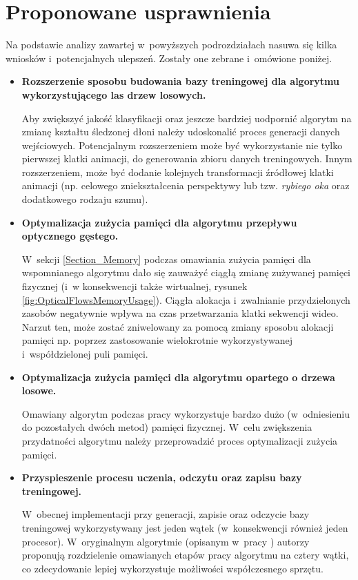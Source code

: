   \section{Proponowane usprawnienia}\label{Section_Usprawnienia}

    Na podstawie analizy zawartej w~powyższych podrozdziałach nasuwa się kilka wniosków i~potencjalnych ulepszeń. Zostały one zebrane i~omówione poniżej.

    \begin{itemize}
      \item \textbf{Rozszerzenie sposobu budowania bazy treningowej dla algorytmu wykorzystującego las drzew losowych.}

      Aby zwiększyć jakość klasyfikacji oraz jeszcze bardziej uodpornić algorytm na zmianę kształtu śledzonej dłoni należy udoskonalić proces generacji danych wejściowych. Potencjalnym rozszerzeniem może być wykorzystanie nie tylko pierwszej klatki animacji, do generowania zbioru danych treningowych. Innym rozszerzeniem, może być dodanie kolejnych transformacji źródłowej klatki animacji (np. celowego zniekształcenia perspektywy lub tzw. \textit{rybiego oka} oraz dodatkowego rodzaju szumu).

      \item \textbf{Optymalizacja zużycia pamięci dla algorytmu przepływu optycznego gęstego.}

      W~sekcji \ref{Section_Memory} podczas omawiania zużycia pamięci dla wspomnianego algorytmu dało się zauważyć ciągłą zmianę zużywanej pamięci fizycznej (i~w konsekwencji także wirtualnej, rysunek \ref{fig:OpticalFlowsMemoryUsage}). Ciągła alokacja i~zwalnianie przydzielonych zasobów negatywnie wpływa na czas przetwarzania klatki sekwencji wideo. Narzut ten, może zostać zniwelowany za pomocą zmiany sposobu alokacji pamięci np. poprzez zastosowanie wielokrotnie wykorzystywanej i~współdzielonej puli pamięci.

      \item \textbf{Optymalizacja zużycia pamięci dla algorytmu opartego o drzewa losowe.}

      Omawiany algorytm podczas pracy wykorzystuje bardzo dużo (w~odniesieniu do pozostałych dwóch metod) pamięci fizycznej. W~celu zwiększenia przydatności algorytmu należy przeprowadzić proces optymalizacji zużycia pamięci.

      \item \textbf{Przyspieszenie procesu uczenia, odczytu oraz zapisu bazy treningowej.}

       W~obecnej implementacji przy generacji, zapisie oraz odczycie bazy treningowej wykorzystywany jest jeden wątek (w~konsekwencji również jeden procesor). W~oryginalnym algorytmie (opisanym w~pracy \cite{RandomizedTrees06}) autorzy proponują rozdzielenie omawianych etapów pracy algorytmu na cztery wątki, co zdecydowanie lepiej wykorzystuje możliwości współczesnego sprzętu.
    \end{itemize}

